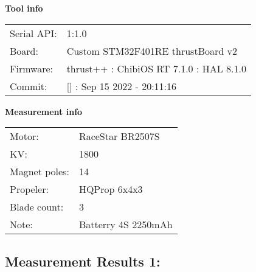 \documentclass[10pt]{article}
\begin{document}
\noindent
{\large \bf Tool info}
\vspace{3mm}

\noindent
\begin{tabular}{ll}
Serial API:  & 1:1.0\\ 
Board:       & Custom STM32F401RE thrustBoard v2\\ 
Firmware:    & thrust++ : ChibiOS RT 7.1.0 : HAL 8.1.0\\ 
Commit:      & [] : Sep 15 2022 - 20:11:16
\end{tabular}
\vspace{3mm}

\noindent
{\large \bf Measurement info}
\vspace{3mm}

\noindent
\begin{tabular}{ll}
Motor:        & RaceStar BR2507S\\ 
KV:           & 1800\\ 
Magnet poles: & 14\\ 
Propeler:     & HQProp 6x4x3\\ 
Blade count:  & 3\\ 
Note:         & Batterry 4S 2250mAh
\end{tabular}

\vspace{3mm}


\subsection*{\large \bf Measurement Results 1:}
\end{document}
